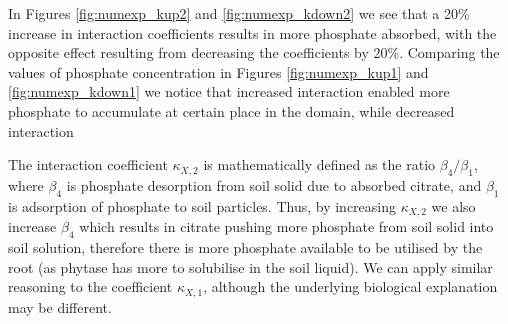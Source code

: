 \documentclass[11pt]{article}
\numberwithin{equation}{section}
\begin{document}
In Figures \ref{fig:numexp_kup2} and \ref{fig:numexp_kdown2} we see that a 20\% increase in interaction coefficients results in more phosphate absorbed, with the opposite effect resulting from decreasing the coefficients by 20\%. Comparing the values of phosphate concentration in Figures \ref{fig:numexp_kup1} and \ref{fig:numexp_kdown1} we notice that increased interaction enabled more phosphate to accumulate at certain place in the domain, while decreased interaction 

The interaction coefficient $\kappa_{X,2}$ is mathematically defined as the ratio $\beta_4 / \beta_1$, where $\beta_4$ is phosphate desorption from soil solid due to absorbed citrate, and $\beta_1$ is adsorption of phosphate to soil particles. Thus, by increasing $\kappa_{X,2}$ we also increase $\beta_4$ which results in citrate pushing more phosphate from soil solid into soil solution, therefore there is more phosphate available to be utilised by the root (as phytase has more  to solubilise in the soil liquid). We can apply similar reasoning to the coefficient $\kappa_{X,1}$, although the underlying biological explanation may be different. 
\end{document}
